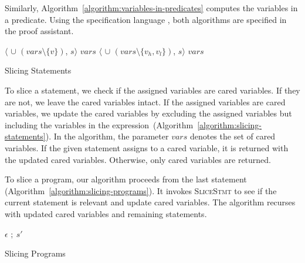 Similarly, Algorithm~\ref{algorithm:variables-in-predicates} computes
the variables in a predicate. Using the \coq specification
language \gallina, both algorithms are specified in the proof
assistant.

\begin{algorithm}
  \begin{algorithmic}[1]
          {\Return $\langle$ 
            $\cup$ $(\mathit{vars} \setminus \{ v \})$, $s \rangle$}
          {\Return $\mathit{vars}$}
      \EndCase
          {\Return $\langle$ $\cup$ 
            $(\mathit{vars} \setminus \{ v_h, v_l \})$, $s \rangle$}
          {\Return $\mathit{vars}$}
      \EndCase
    \EndMatch
    \EndFunction
  \end{algorithmic}
  \caption{Slicing Statements}
  \label{algorithm:slicing-statements}
\end{algorithm}

To slice a statement, we check if the assigned variables are
cared variables. If they are not, we leave the cared
variables intact. 
If the assigned variables are cared variables, we update the cared
variables by excluding the assigned variables but including
the variables in the
expression~(Algorithm~\ref{algorithm:slicing-statements}). In the
algorithm,  
the parameter $\mathit{vars}$ denotes the set of cared variables.
If the given statement assigns to a cared variable, it is
returned with the updated cared variables. Otherwise, only
cared variables are returned.

To slice a program, our algorithm proceeds from the last statement
(Algorithm~\ref{algorithm:slicing-programs}). It invokes
\textsc{SliceStmt} to see if the current statement is relevant
and update cared variables. The algorithm recurses with
updated cared variables and remaining statements.

\begin{algorithm}
  \begin{algorithmic}[1]
      \Case{$\epsilon$}
        \Return $\epsilon$
      \EndCase
            \Return {}
          \EndCase
            \Return {}$;\ s'$
          \EndCase
        \EndMatch
      \EndCase
    \EndMatch
    \EndFunction
  \end{algorithmic}
  \caption{Slicing Programs}
  \label{algorithm:slicing-programs}
\end{algorithm}


